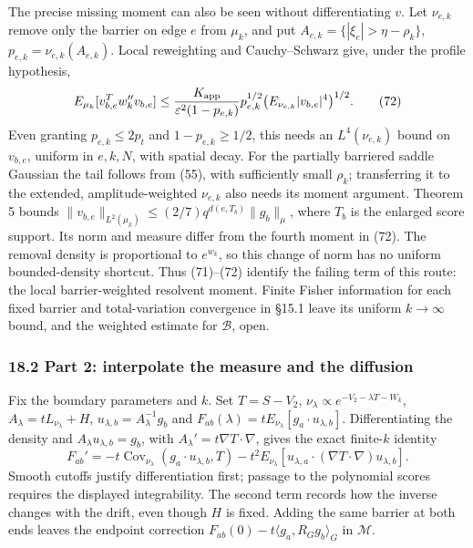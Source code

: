 \documentclass[11pt,a4paper]{article}
\begin{document}
The precise missing moment can also be seen without differentiating
\(v\). Let \(\nu_{e,k}\) remove only the barrier on edge \(e\) from
\(\mu_k\), and put \(A_{e,k}=\{|\xi_e|>\eta-\rho_k\}\),
\(p_{e,k}=\nu_{e,k}(A_{e,k})\). Local reweighting and Cauchy--Schwarz
give, under the profile hypothesis, \[E_{\mu_k}[v_{b,e}^Tw_k''v_{b,e}]
\le {K_{\rm app}\over\varepsilon^2(1-p_{e,k})}
 p_{e,k}^{1/2}\bigl(E_{\nu_{e,k}}|v_{b,e}|^4\bigr)^{1/2}.\tag{72}\] Even
granting \(p_{e,k}\le2p_t\) and \(1-p_{e,k}\ge1/2\), this needs an
\(L^4(\nu_{e,k})\) bound on \(v_{b,e}\), uniform in \(e,k,N\), with
spatial decay. For the partially barriered saddle Gaussian the tail
follows from (55), with sufficiently small \(\rho_k\); transferring it
to the extended, amplitude-weighted \(\nu_{e,k}\) also needs its moment
argument. Theorem 5 bounds
\(\|v_{b,e}\|_{L^2(\mu_k)}\le(2/7)q^{d(e,T_b)}\|g_b\|_\mu\), where
\(T_b\) is the enlarged score support. Its norm and measure differ from
the fourth moment in (72). The removal density is proportional to
\(e^{w_k}\), so this change of norm has no uniform bounded-density
shortcut. Thus (71)--(72) identify the failing term of this route: the
local barrier-weighted resolvent moment. Finite Fisher information for
each fixed barrier and total-variation convergence in §15.1 leave its
uniform \(k\to\infty\) bound, and the weighted estimate for
\(\mathcal B\), open.

\hypertarget{part-2-interpolate-the-measure-and-the-diffusion}{%
\subsubsection{18.2 Part 2: interpolate the measure and the
diffusion}\label{part-2-interpolate-the-measure-and-the-diffusion}}

Fix the boundary parameters and \(k\). Set \(T=S-V_2\),
\(\nu_\lambda\propto e^{-V_2-\lambda T-W_k}\),
\(A_\lambda=tL_{\nu_\lambda}+H\), \(u_{\lambda,b}=A_\lambda^{-1}g_b\)
and \(F_{ab}(\lambda)=tE_{\nu_\lambda}[g_a\cdot u_{\lambda,b}]\).
Differentiating the density and \(A_\lambda u_{\lambda,b}=g_b\), with
\(A_\lambda'=t\nabla T\cdot\nabla\), gives the exact finite-\(k\)
identity
\[F_{ab}'=-t\operatorname{Cov}_{\nu_\lambda}(g_a\cdot u_{\lambda,b},T)
-t^2E_{\nu_\lambda}[u_{\lambda,a}\cdot(\nabla T\cdot\nabla)u_{\lambda,b}].\tag{73}\]
Smooth cutoffs justify differentiation first; passage to the polynomial
scores requires the displayed integrability. The second term records how
the inverse changes with the drift, even though \(H\) is fixed. Adding
the same barrier at both ends leaves the endpoint correction
\(F_{ab}(0)-t\langle g_a,R_Gg_b\rangle_G\) in \(\mathcal M\).
\end{document}
